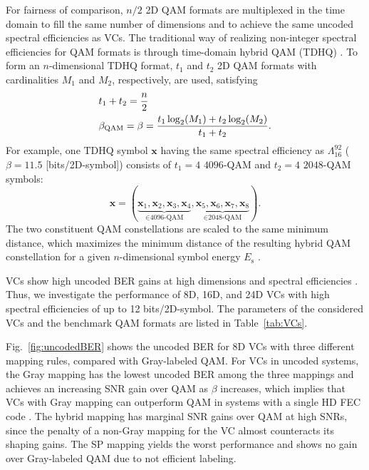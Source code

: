 \documentclass[journal]{IEEEtran}
\newcommand{\bx}{\boldsymbol{x}}
\begin{document}
For fairness of comparison, $n/2$ 2D QAM formats are multiplexed in the time domain to fill the same number of dimensions and to achieve the same uncoded spectral efficiencies as VCs. The traditional way of realizing non-integer spectral efficiencies for QAM formats is through time-domain hybrid QAM (TDHQ) \cite{cho19,zhugeofc13,zhoujlt13,zhoucm13}. To form an $n$-dimensional TDHQ format, $t_1$ and $t_2$ 2D QAM formats with cardinalities $M_1$ and $M_2$, respectively, are used, satisfying
\begin{align}
&t_1+t_2=\frac{n}{2} \notag\\&\beta_{\text{QAM}}=\beta=\frac{t_1\log_2(M_1)+t_2\log_2(M_2)}{t_1+t_2}.\notag
\end{align}
For example, one TDHQ symbol $\bx$ having the same spectral efficiency as $\Lambda_{16}^{92}$ ($\beta=11.5$ [bits/2D-symbol]) consists of $t_1=4$ $4096$-QAM and $t_2=4$ $2048$-QAM symbols:
\[\bx=
  (\underbrace{\bx_1,\bx_2,\bx_3,\bx_4}_\text{$\in$4096-QAM},\underbrace{\bx_5,\bx_6,\bx_7,\bx_8}_\text{$\in$2048-QAM}).
\]
The two constituent QAM constellations are scaled to the same minimum distance, which maximizes the minimum distance of the resulting hybrid QAM constellation for a given $n$-dimensional symbol energy $E_\text{s}$ \cite[Ch.~4.3]{principle}. 

VCs show high uncoded BER gains at high dimensions and spectral efficiencies \cite[Fig.~5]{ourjlt}. Thus, we investigate the performance of 8D, 16D, and 24D VCs with high spectral efficiencies of up to 12 bits/2D-symbol. The parameters of the considered VCs and the benchmark QAM formats are listed in Table~\ref{tab:VCs}.

Fig.~\ref{fig:uncodedBER} shows the uncoded BER for 8D VCs with three different mapping rules, compared with Gray-labeled QAM. For VCs in uncoded systems, the Gray mapping has the lowest uncoded BER among the three mappings and achieves an increasing SNR gain over QAM as $\beta$ increases, which implies that VCs with Gray mapping can outperform QAM in systems with a single HD FEC code \cite[Fig.~5]{ourjlt}. The hybrid mapping has marginal SNR gains over QAM at high SNRs, since the penalty of a non-Gray mapping for the VC almost counteracts its shaping gains. The SP mapping yields the worst performance and shows no gain over Gray-labeled QAM due to not efficient labeling. 
\end{document}
